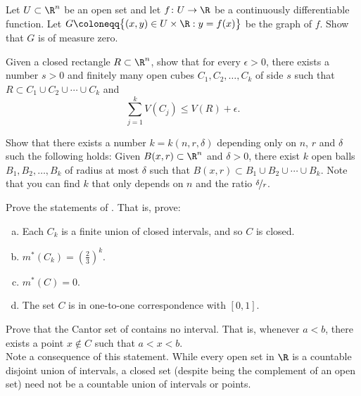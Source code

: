 \begin{exercise}
Let $U \subset \R^n$ be an open set
and let $f \colon U \to \R$ be a continuously differentiable function.
Let $G \coloneqq \bigl\{ (x,y) \in U \times \R : y = f(x) \bigr\}$ be the graph of $f$.
Show that $G$ is of measure zero.
\end{exercise}

\begin{exercise}
Given a closed rectangle $R \subset \R^n$, show that for every $\epsilon > 0$,
there exists a number $s > 0$ and finitely many open cubes
$C_1,C_2,\ldots,C_k$ of side $s$ such that
$R \subset C_1 \cup C_2 \cup \cdots \cup C_k$ and
\begin{equation*}
\sum_{j=1}^k V(C_j) \leq V(R) + \epsilon .
\end{equation*}
\end{exercise}

\begin{exercise}
Show that there exists a number $k = k(n,r,\delta)$ depending only on $n$,
$r$ and $\delta$ such
the following holds:
Given $B(x,r) \subset \R^n$ and $\delta > 0$, there exist
$k$ open balls $B_1,B_2,\ldots,B_k$ of radius at most
$\delta$ such that $B(x,r) \subset B_1 \cup B_2 \cup \cdots \cup B_k$.
Note that you can find $k$ that only depends on $n$ and the ratio
$\nicefrac{\delta}{r}$.
\end{exercise}

\begin{exercise}[Challenging]
Prove the statements of .  That is,
prove:
\begin{enumerate}[a)]
\item
Each $C_k$ is a finite union of closed intervals, and so $C$ is closed.
\item
$m^*(C_k) = {\left(\frac{2}{3}\right)}^k$.
\item
$m^*(C) = 0$.
\item
The set $C$ is in one-to-one correspondence with $[0,1]$.
\end{enumerate}
\end{exercise}

\begin{exercise}
\pagebreak[3]
Prove that the Cantor set of  contains no
interval.  That is, whenever $a < b$, there exists a point $x \notin C$
such that $a < x < b$.
\\
Note a consequence of this statement.  While every open set in
$\R$ is a countable disjoint union of intervals, a closed set (despite
being the complement of an open set) need not be a countable union of
intervals or points.
\end{exercise}

